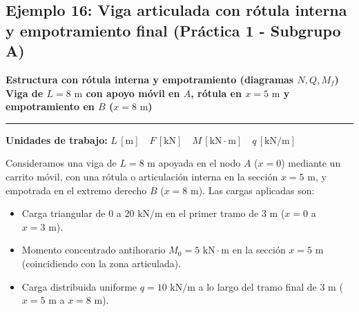 \subsection{Ejemplo 16: Viga articulada con rótula interna y empotramiento final (Práctica 1 - Subgrupo A)}

\begin{tcolorbox}[colback=blue!3!white, colframe=blue!40!black, arc=3pt, boxrule=0.8pt, left=8pt, right=8pt, top=6pt, bottom=6pt]
    \centering
    {\Large\bfseries\color{blue!60!black} Estructura con rótula interna y empotramiento (diagramas $N, Q, M_f$)}\\[2pt]
    {\normalsize\bfseries Viga de $L = 8\text{ m}$ con apoyo móvil en $A$, rótula en $x=5\text{ m}$ y empotramiento en $B$ ($x=8\text{ m}$)}

    \vspace{4pt}\hrule\vspace{4pt}
    {\small\textbf{Unidades de trabajo:} $L\,[\text{m}] \quad F\,[\text{kN}] \quad M\,[\text{kN}\cdot\text{m}] \quad q\,[\text{kN/m}]$}
\end{tcolorbox}


Consideramos una viga de $L = 8\text{ m}$ apoyada en el nodo $A$ ($x=0$) mediante un carrito móvil, con una rótula o articulación interna en la sección $x = 5\text{ m}$, y empotrada en el extremo derecho $B$ ($x=8\text{ m}$).
Las cargas aplicadas son:
\begin{itemize}
    \item Carga triangular de $0$ a $20\text{ kN/m}$ en el primer tramo de $3\text{ m}$ ($x=0$ a $x=3\text{ m}$).
    \item Momento concentrado antihorario $M_0 = 5\text{ kN}\cdot\text{m}$ en la sección $x = 5\text{ m}$ (coincidiendo con la zona articulada).
    \item Carga distribuida uniforme $q = 10\text{ kN/m}$ a lo largo del tramo final de $3\text{ m}$ ($x=5\text{ m}$ a $x=8\text{ m}$).
\end{itemize}

